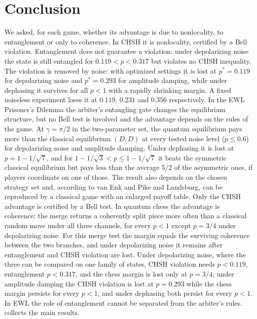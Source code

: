 \documentclass[11pt,a4paper]{article}
\begin{document}
\section{Conclusion}

We asked, for each game, whether its advantage is due to nonlocality, to entanglement or only to coherence. In CHSH it is nonlocality, certified by a Bell violation. Entanglement does not guarantee a violation: under depolarizing noise the state is still entangled for $0.119<p<0.317$ but violates no CHSH inequality. The violation is removed by noise: with optimized settings it is lost at $p^*=0.119$ for depolarizing noise and $p^*=0.293$ for amplitude damping, while under dephasing it survives for all $p<1$ with a rapidly shrinking margin. A fixed noiseless experiment loses it at $0.119$, $0.231$ and $0.356$ respectively. In the EWL Prisoner's Dilemma the arbiter's entangling gate changes the equilibrium structure, but no Bell test is involved and the advantage depends on the rules of the game. At $\gamma=\pi/2$ in the two-parameter set, the quantum equilibrium pays more than the classical equilibrium $(D,D)$ at every tested noise level ($p\le0.6$) for depolarizing noise and amplitude damping. Under dephasing it is lost at $p=1-1/\sqrt7$, and for $1-1/\sqrt3<p\le1-1/\sqrt7$ it beats the symmetric classical equilibrium but pays less than the average $5/2$ of the asymmetric ones, if players coordinate on one of those. The result also depends on the chosen strategy set and, according to van Enk and Pike and Landsburg, can be reproduced by a classical game with an enlarged payoff table. Only the CHSH advantage is certified by a Bell test. In quantum chess the advantage is coherence: the merge returns a coherently split piece more often than a classical random move under all three channels, for every $p<1$ except $p=3/4$ under depolarizing noise. For this merge test the margin equals the surviving coherence between the two branches, and under depolarizing noise it remains after entanglement and CHSH violation are lost. Under depolarizing noise, where the three can be compared on one family of states, CHSH violation needs $p<0.119$, entanglement $p<0.317$, and the chess margin is lost only at $p=3/4$; under amplitude damping the CHSH violation is lost at $p=0.293$ while the chess margin persists for every $p<1$, and under dephasing both persist for every $p<1$. In EWL the role of entanglement cannot be separated from the arbiter's rules.  collects the main results.
\end{document}
